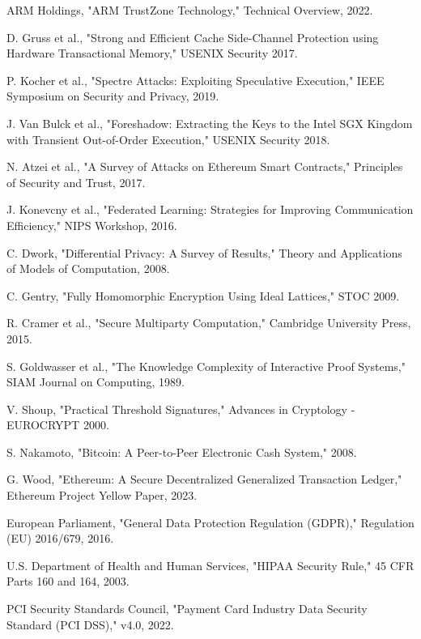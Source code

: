 \documentclass[12pt,a4paper]{article}
\begin{document}
\begin{thebibliography}{99}
ARM Holdings, "ARM TrustZone Technology," Technical Overview, 2022.

D. Gruss et al., "Strong and Efficient Cache Side-Channel Protection using Hardware Transactional Memory," USENIX Security 2017.

P. Kocher et al., "Spectre Attacks: Exploiting Speculative Execution," IEEE Symposium on Security and Privacy, 2019.

J. Van Bulck et al., "Foreshadow: Extracting the Keys to the Intel SGX Kingdom with Transient Out-of-Order Execution," USENIX Security 2018.

N. Atzei et al., "A Survey of Attacks on Ethereum Smart Contracts," Principles of Security and Trust, 2017.

J. Konevcny et al., "Federated Learning: Strategies for Improving Communication Efficiency," NIPS Workshop, 2016.

C. Dwork, "Differential Privacy: A Survey of Results," Theory and Applications of Models of Computation, 2008.

C. Gentry, "Fully Homomorphic Encryption Using Ideal Lattices," STOC 2009.

R. Cramer et al., "Secure Multiparty Computation," Cambridge University Press, 2015.

S. Goldwasser et al., "The Knowledge Complexity of Interactive Proof Systems," SIAM Journal on Computing, 1989.

V. Shoup, "Practical Threshold Signatures," Advances in Cryptology - EUROCRYPT 2000.

S. Nakamoto, "Bitcoin: A Peer-to-Peer Electronic Cash System," 2008.

G. Wood, "Ethereum: A Secure Decentralized Generalized Transaction Ledger," Ethereum Project Yellow Paper, 2023.

European Parliament, "General Data Protection Regulation (GDPR)," Regulation (EU) 2016/679, 2016.

U.S. Department of Health and Human Services, "HIPAA Security Rule," 45 CFR Parts 160 and 164, 2003.

PCI Security Standards Council, "Payment Card Industry Data Security Standard (PCI DSS)," v4.0, 2022.


\end{thebibliography}
\end{document}
